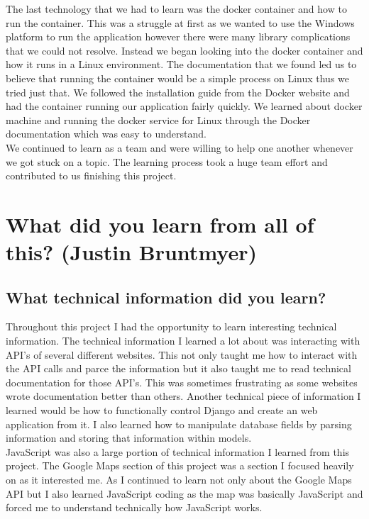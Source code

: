 \documentclass[draftclsnofoot,10pt,onecolumn]{IEEEtran} %
\begin{document}
The last technology that we had to learn was the docker container and how to run the container. This was a struggle at first as 
we wanted to use the Windows platform to run the application however there were many library complications that we could not 
resolve. Instead we began looking into the docker container and how it runs in a Linux environment. The documentation that we 
found led us to believe that running the container would be a simple process on Linux thus we tried just that. We followed 
the installation guide from the Docker website and had the container running our application fairly quickly. We learned about 
docker machine and running the docker service for Linux through the Docker documentation which was easy to understand. \\

We continued to learn as a team and were willing to help one another whenever we got stuck on a topic. The learning process 
took a huge team effort and contributed to us finishing this project. \\



\section{What did you learn from all of this? (Justin Bruntmyer)}

\subsection{What technical information did you learn?}
Throughout this project I had the opportunity to learn interesting technical information. The technical information I learned 
a lot about was interacting with API's of several different websites. This not only taught me how to interact with the API
calls and parce the information but it also taught me to read technical documentation for those API's. This was sometimes
frustrating as some websites wrote documentation better than others. Another technical piece of information I learned would
be how to functionally control Django and create an web application from it. I also learned how to manipulate database fields
by parsing information and storing that information within models. \\

JavaScript was also a large portion of technical information I learned from this project. The Google Maps section of this project
was a section I focused heavily on as it interested me. As I continued to learn not only about the Google Maps API but I also 
learned JavaScript coding as the map was basically JavaScript and forced me to understand technically how JavaScript works. \\
\end{document}
